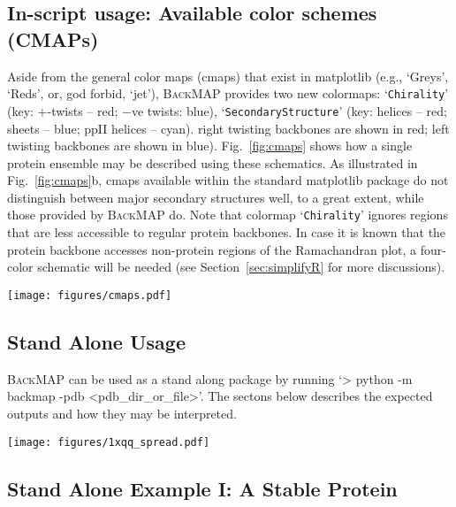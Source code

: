 \documentclass[fleqn,10pt,lineno]{wlpeerj} %
\newcommand{\Fig}[1]{Fig.~\ref{#1}}
\newcommand{\Sec}[1]{Section~\ref{#1}}
\newcommand{\gname}{BackMAP}
\newcommand{\pname}{\textsc{\gname}\xspace}
\newcommand{\code}[1]{\texttt{#1}\xspace}
\begin{document}
\subsection*{In-script usage: Available color schemes (CMAPs)}
Aside from the general color maps (cmaps) that exist in matplotlib (e.g., `Greys', `Reds', or, god forbid, `jet'), 
\pname provides two new colormaps: `\code{Chirality}' (key: $+$-twists -- red; $-$ve twists: blue), `\code{SecondaryStructure}' (key: helices -- red; sheets -- blue; ppII helices -- cyan). right twisting backbones are shown in red; left twisting backbones are shown in blue). \Fig{fig:cmaps} shows how a single protein ensemble
may be described using these schematics. As illustrated in \Fig{fig:cmaps}b, cmaps available within the standard matplotlib package do not distinguish between major secondary structures well, to a great extent, while those provided by \pname do. Note that colormap `\code{Chirality}' ignores regions that are less accessible to regular protein backbones. In case it is known that the protein backbone accesses non-protein regions of the Ramachandran plot, a four-color schematic will be needed (see \Sec{sec:simplifyR} for more discussions).
\begin{figure*}[t!]
\centering
\texttt{[image: figures/cmaps.pdf]}
\caption{A protein ensemble (a) along with some MAPs colored with different themes (b-d). Panels (c) and (d) are provided by the \pname module. In Panel (a), $\upbeta$-sheets are shown in blue and all helices are shown in red.\label{fig:cmaps}} 
\end{figure*}

\subsection*{Stand Alone Usage}

\pname can be used as a stand along package by running `> python -m backmap -pdb <pdb\_dir\_or\_file>'. The sectons below describes the expected outputs and how they may be interpreted.

\begin{figure*}[b!]
\texttt{[image: figures/1xqq\_spread.pdf]}
\caption{Protein \href{https://www.rcsb.org/structure/1XQQ}{1xqq} describes a stable protein.\label{fig:example1}} 
\end{figure*}

\subsection*{Stand Alone Example I: A Stable Protein}
\end{document}
